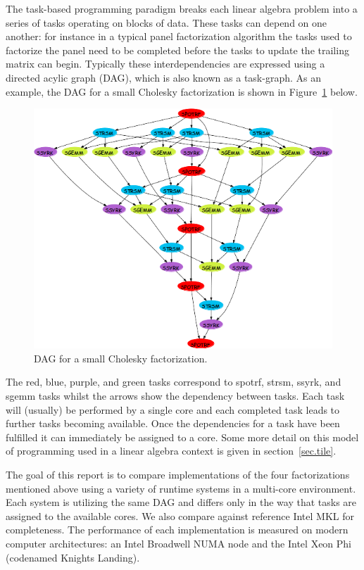 \documentclass[a4paper,12pt]{article}
\begin{document}
The task-based programming paradigm breaks each linear algebra
problem into a series of tasks operating on blocks of data.
These tasks can depend on one another:
for instance in a typical panel factorization algorithm
the tasks used to factorize the panel need to be completed
before the tasks to update the trailing matrix can begin.
Typically these interdependencies are expressed using a
directed acylic graph (DAG),
which is also known as a task-graph.
As an example,
the DAG for a small Cholesky factorization is shown in
Figure~\ref{fig.chol_dag} below.
\begin{figure}[th]
  \centering
  \includegraphics[scale=.6]{fig/spotrf_dag.png}
  \caption{DAG for a small Cholesky factorization.}
  \label{fig.chol_dag}
\end{figure}

The red, blue, purple, and green tasks correspond to
spotrf, strsm, ssyrk, and sgemm tasks
whilst the arrows show the dependency between tasks.
Each task will (usually) be performed by a single core
and each completed task leads to further tasks becoming available.
Once the dependencies for a task have been fulfilled it
can immediately be assigned to a core.
Some more detail on this model of programming
used in a linear algebra context is given in section~\ref{sec.tile}.

The goal of this report is to compare implementations of
the four factorizations mentioned above
using a variety of runtime systems in a multi-core environment.
Each system is utilizing the same DAG and differs only in the way
that tasks are assigned to the available cores.
We also compare against reference Intel MKL
for completeness.
The performance of each implementation is measured
on modern computer architectures:
an Intel Broadwell NUMA node
and the Intel Xeon Phi (codenamed Knights Landing).
\end{document}
